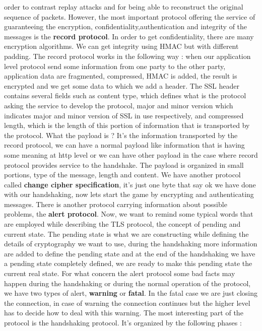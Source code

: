 \documentclass[11pt]{article}
\begin{document}
order to contrast replay attacks and for being able to reconstruct the original sequence of packets. However, the most important protocol offering the service of guaranteeing the encryption, confidentiality,authentication and integrity of the messages is the \textbf{record protocol}. In order to get confidentiality, there are many encryption algorithms. We can get integrity using HMAC but with different padding. The record protocol works in the following way : when our application level protocol send some information from one party to the other party, application data are fragmented, compressed, HMAC is added, the result is encrypted and we get some data to which we add a header. The SSL header contains several fields such as content type, which defines what is the protocol asking the service to develop the protocol, major and minor version which indicates major and minor version of SSL in use respectively, and compressed length, which is the length of this portion of information that is transported by the protocol. What the payload is ? It's the information transported by the record protocol, we can have a normal payload like information that is having some meaning at http level or we can have other payload in the case where record protocol provides service to the handshake. The payload is organized in small portions, type of the message, length and content. We have another protocol called \textbf{change cipher specification}, it's just one byte that say ok we have done with our handshaking, now lets start the game by encrypting and authenticating messages. There is another protocol carrying information about possible problems, the \textbf{alert protocol}. Now, we want to remind some typical words that are employed while describing the TLS protocol, the concept of pending and current state. The pending state is what we are constructing while defining the details of cryptography we want to use, during the handshaking more information are added to define the pending state and at the end of the handshaking we have a pending state completely defined, we are ready to make this pending state the current real state. For what concern the alert protocol some bad facts may happen during the handshaking or during the normal operation of the protocol, we have two types of alert, \textbf{warning} or \textbf{fatal}. In the fatal case we are just closing the connection, in case of warning the connection continues but the higher level has to decide how to deal with this warning. The most interesting part of the protocol is the handshaking protocol. It's organized by the following phases :
\end{document}
